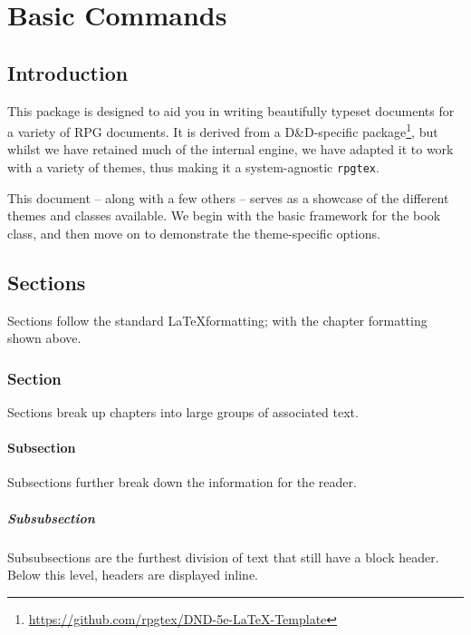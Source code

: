 
\frontmatter
\maketitle
\tableofcontents


\mainmatter

\part{Basic Commands}

	\chapter{Introduction}


	 This package is designed to aid you in writing beautifully typeset documents for a variety of RPG documents. It is derived from {a D\&D-specific package}\footnote{\url{https://github.com/rpgtex/DND-5e-LaTeX-Template}}, but whilst we have retained much of the internal engine, we have adapted it to work with a variety of themes, thus making it a system-agnostic \verb|rpgtex|.

	This document -- along with a few others -- serves as a showcase of the different themes and classes available. We begin with the basic framework for the book class, and then move on to demonstrate the theme-specific options.

	\chapter{Sections}
		Sections follow the standard \LaTeX formatting; with the chapter formatting shown above.
		\section{Section}
			Sections break up chapters into large groups of associated text.

			\subsection{Subsection}
				Subsections further break down the information for the reader.

				\subsubsection{Subsubsection}
					Subsubsections are the furthest division of text that still have a block header. Below this level, headers are displayed inline.

